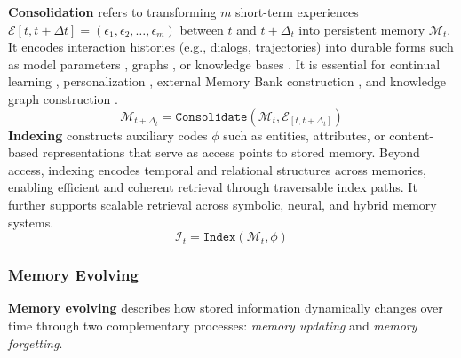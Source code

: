 \documentclass[manuscript,screen]{acmart}
\begin{document}
\textbf{Consolidation} \citep{squire2015memory} refers to transforming $m$ short-term experiences $\mathcal{E}{[t, t+\Delta{t}]} = (\epsilon_{1}, \epsilon_{2}, \dots, \epsilon_{m})$ between $t$ and $t+\Delta_{t}$ into persistent memory $\mathcal{M}_{t}$. It encodes interaction histories (e.g., dialogs, trajectories) into durable forms such as model parameters \citep{wang2024towards}, graphs \citep{zhao2025eventweave}, or knowledge bases \citep{lu2023memochat}. It is essential for continual learning \citep{feng2024tasl}, personalization \citep{zhang-etal-2024-llm-based}, external Memory Bank construction \citep{zhong2024memorybank}, and knowledge graph construction \citep{xu2024generate}.
\begin{equation}
    \mathcal{M}_{t+\Delta_{t}}=\texttt{Consolidate}(\mathcal{M}_{t}, \mathcal{E}_{[t, t+\Delta_{t}]})
\end{equation}
\textbf{Indexing} \citep{maekawa2023generative} constructs auxiliary codes $\phi$ such as entities, attributes, or content-based representations \citep{wu2024longmemeval} that serve as access points to stored memory. Beyond access, indexing encodes temporal \citep{maharana2024evaluating} and relational structures \citep{mehta2022dsi++} across memories, enabling efficient and coherent retrieval through traversable index paths. It further supports scalable retrieval across symbolic, neural, and hybrid memory systems.
\begin{equation}
    \mathcal{I}_{t} = \texttt{Index}(\mathcal{M}_{t}, \phi)
\end{equation}

\subsubsection{Memory Evolving}

\textbf{Memory evolving} describes how stored information dynamically changes over time through two complementary processes: \textit{memory updating} and \textit{memory forgetting}.
\end{document}
